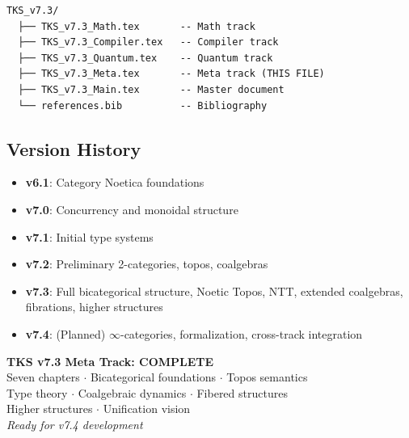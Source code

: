 \begin{verbatim}
TKS_v7.3/
  ├── TKS_v7.3_Math.tex       -- Math track
  ├── TKS_v7.3_Compiler.tex   -- Compiler track
  ├── TKS_v7.3_Quantum.tex    -- Quantum track
  ├── TKS_v7.3_Meta.tex       -- Meta track (THIS FILE)
  ├── TKS_v7.3_Main.tex       -- Master document
  └── references.bib          -- Bibliography
\end{verbatim}

\subsection{Version History}
\label{subsec:version-history}

\begin{itemize}
  \item \textbf{v6.1}: Category Noetica foundations
  \item \textbf{v7.0}: Concurrency and monoidal structure
  \item \textbf{v7.1}: Initial type systems
  \item \textbf{v7.2}: Preliminary 2-categories, topos, coalgebras
  \item \textbf{v7.3}: Full bicategorical structure, Noetic Topos, NTT,
        extended coalgebras, fibrations, higher structures
  \item \textbf{v7.4}: (Planned) $\infty$-categories, formalization, cross-track integration
\end{itemize}

\begin{tcolorbox}[colback=green!5!white,colframe=green!75!black,title=\textbf{End of v7.3 Meta Track},breakable]
\begin{center}
\textbf{TKS v7.3 Meta Track: COMPLETE}\\[0.5em]
Seven chapters $\cdot$ Bicategorical foundations $\cdot$ Topos semantics\\
Type theory $\cdot$ Coalgebraic dynamics $\cdot$ Fibered structures\\
Higher structures $\cdot$ Unification vision\\[1em]
\textit{Ready for v7.4 development}
\end{center}
\end{tcolorbox}

